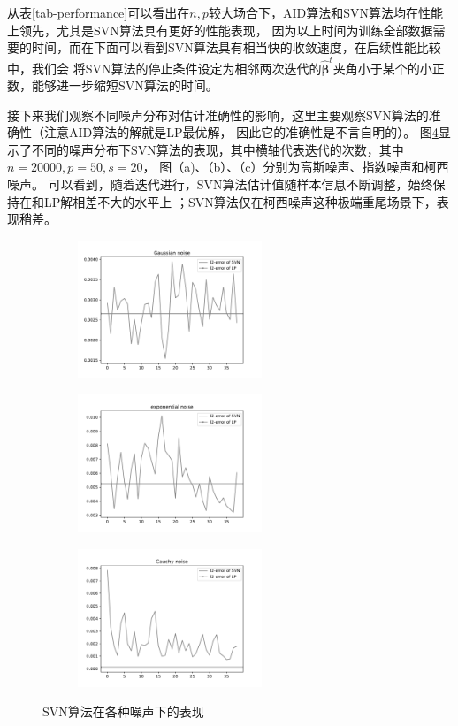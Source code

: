从表\ref{tab-performance}可以看出在$n,p$较大场合下，AID算法和SVN算法均在性能上领先，尤其是SVN算法具有更好的性能表现，
因为以上时间为训练全部数据需要的时间，而在下面可以看到SVN算法具有相当快的收敛速度，在后续性能比较中，我们会
将SVN算法的停止条件设定为相邻两次迭代的$\hat{\bm{\beta}}^t$夹角小于某个的小正数，能够进一步缩短SVN算法的时间。

接下来我们观察不同噪声分布对估计准确性的影响，这里主要观察SVN算法的准确性（注意AID算法的解就是LP最优解，
因此它的准确性是不言自明的）。
图\ref{svn-noise}显示了不同的噪声分布下SVN算法的表现，其中横轴代表迭代的次数，其中$n=20000,p=50,s=20$，
图（a)、（b）、（c）分别为高斯噪声、指数噪声和柯西噪声。
可以看到，随着迭代进行，SVN算法估计值随样本信息不断调整，始终保持在和LP解相差不大的水平上
；SVN算法仅在柯西噪声这种极端重尾场景下，表现稍差。

\begin{figure}[H]
    \centering
    \begin{subfigure}[t]{0.3\textwidth}\label{svn-demo1}
    \includegraphics[width=5.5cm]{pics/chapter2/gaussian-svn.pdf}
    \end{subfigure}
    \begin{subfigure}[t]{0.3\textwidth}\label{svn-demo2}
    \includegraphics[width=5.5cm]{pics/chapter2/exp-svn.pdf}
    \end{subfigure}
    \begin{subfigure}[t]{0.3\textwidth}\label{svn-demo3}
    \includegraphics[width=5.5cm]{pics/chapter2/cauchy-svn.pdf}
    \end{subfigure}
    \caption{ \small SVN算法在各种噪声下的表现}
    \label{svn-noise}
\end{figure}

